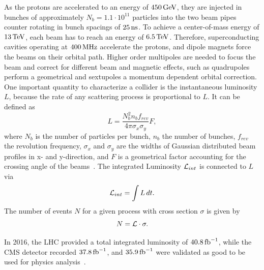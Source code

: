 As the protons are accelerated to an energy of $450\,\text{Ge\hspace{-.08em}V}$, they are injected in bunches of approximately $N_b=1.1\cdot10^{11}$ particles into the two beam pipes counter rotating in bunch spacings of $25\,\text{ns}$. To achieve a center-of-mass energy of $13\,\text{Te\hspace{-.08em}V}$, each beam has to reach an energy of $6.5\,\text{Te\hspace{-.08em}V}$. Therefore, superconducting cavities operating at $400\,\text{MHz}$ accelerate the protons, and dipole magnets force the beams on their orbital path. Higher order multipoles are needed to focus the beam and correct for different beam and magnetic effects, such as quadrupoles perform a geometrical and sextupoles a momentum dependent orbital correction. \\
One important quantity to characterize a collider is the instantaneous luminosity $L$, because the rate of any scattering process is proportional to $L$. It can be defined as
\begin{equation}
 L = \frac{N_{b}^2 n_{b} f_{rev}} {4\pi \sigma_{x} \sigma_{y}}F,
\end{equation}
where $N_b$ is the number of particles per bunch, $n_b$ the number of bunches, $f_{rev}$ the revolution frequency, $\sigma_{x}$ and $\sigma_{y}$ are the widths of Gaussian distributed beam profiles in x- and y-direction, and $F$ is a geometrical factor accounting for the crossing angle of the beams~\cite{LuminosityConcept}. The integrated Luminosity $\mathcal{L}_{int}$ is connected to $L$ via
\begin{equation}
 \mathcal{L}_{int}= \int L \,dt.
\end{equation}
The number of events $N$ for a given process with cross section $\sigma$ is given by
\begin{equation}
 N= \mathcal{L} \cdot \sigma.
\end{equation}

In 2016, the LHC provided a total integrated luminosity of $40.8\mbox{\ensuremath{\,\text{fb}^\text{$-$1}}}$, while the CMS detector recorded $37.8\mbox{\ensuremath{\,\text{fb}^\text{$-$1}}}$, and $35.9\mbox{\ensuremath{\,\text{fb}^\text{$-$1}}}$ were validated as good to be used for physics analysis~\cite{DataQuality}.





